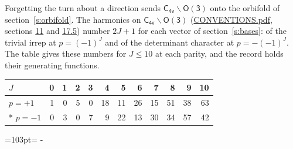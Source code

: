 \documentclass[10pt,a4paper]{article}
\newcommand{\needspace}[1]{\par\penalty-100\begingroup\dimen0=#1\relax\dimen2=\pagegoal
  \advance\dimen2-\pagetotal\ifdim\dimen0>\dimen2\relax\ifdim\dimen2>0pt\vfil\break\fi\fi
  \endgroup}
\numberwithin{equation}{section}
\newcommand{\grp}[1]{\mathsf{#1}}
\begin{document}
Forgetting the turn about a direction sends $\grp{C_{4v}}\backslash\grp{O(3)}$ onto the orbifold of section~\ref{s:orbifold}.
The harmonics on $\grp{C_{4v}}\backslash\grp{O(3)}$ (\href{../../CONVENTIONS.pdf}{CONVENTIONS.pdf}, sections \href{../../CONVENTIONS.pdf\#conv.11}{11} and \href{../../CONVENTIONS.pdf\#conv.17.5}{17.5}) number $2J + 1$ for each vector of section~\ref{s:bases}: of the trivial irrep at $p = (-1)^J$ and of the determinant character at $p = -(-1)^J$. The table gives these numbers for $J \le 10$ at each parity, and the record holds their generating functions.
{\small\setlength{\tabcolsep}{4pt}\begin{longtable}{@{}lrrrrrrrrrrr@{}}\toprule
$J$ & 0 & 1 & 2 & 3 & 4 & 5 & 6 & 7 & 8 & 9 & 10\\\midrule\endhead
\bottomrule\endfoot\endlastfoot
$p = +1$ & 1 & 0 & 5 & 0 & 18 & 11 & 26 & 15 & 51 & 38 & 63\\*
$p = -1$ & 0 & 3 & 0 & 7 & 9 & 22 & 13 & 30 & 34 & 57 & 42\\
\bottomrule\end{longtable}}
\needspace{103pt}
\end{document}
